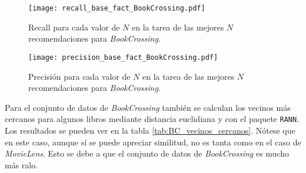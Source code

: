 \begin{figure}[H]
	\centering
 	\texttt{[image: recall\_base\_fact\_BookCrossing.pdf]}
 	\caption{Recall para cada valor de $N$ en la tarea de las mejores $N$ recomendaciones para \textit{BookCrossing}.}
 	\label{fig:BC_recall_top_N}
\end{figure}

\begin{figure}[H]
	\centering
 	\texttt{[image: precision\_base\_fact\_BookCrossing.pdf]}
 	\caption{Precisión para cada valor de $N$ en la tarea de las mejores $N$ recomendaciones para \textit{BookCrossing}.}
 	\label{fig:BC_precision_top_N}
\end{figure}

Para el conjunto de datos de \textit{BookCrossing} también se calculan los vecinos más cercanos para algunos libros mediante distancia euclidiana y con el paquete \texttt{RANN}. Los resultados se pueden ver en la tabla \ref{tab:BC_vecinos_cercanos}. Nótese que en este caso, aunque sí se puede apreciar similitud, no es tanta como en el caso de \textit{MovieLens}. Esto se debe a que el conjunto de datos de \textit{BookCrossing} es mucho más ralo.

